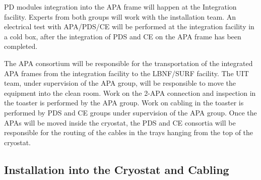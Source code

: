 
PD modules integration into the APA frame will happen at the Integration facility. Experts from both groups will work with the installation team. 
An electrical test with APA/PDS/CE will be performed at the integration facility in a cold box, after the integration of PDS and CE on the APA frame has been completed.

The APA consortium will be responsible for the transportation of the integrated APA frames from the integration facility to the LBNF/SURF facility. 
The UIT team, under supervision of the APA group, will be responsible to move the equipment into the clean room. 
Work on the 2-APA connection and inspection in the toaster is performed by the APA group.
Work on cabling in the toaster is performed by PDS and CE groups under supervision of the APA group.
Once the APAs will be moved inside the cryostat, the PDS and CE consortia will be responsible for the routing of the cables in the trays hanging from the top of the cryostat. 



\subsection{Installation into the Cryostat and Cabling}
\label{sec:fdsp-pd-install-pd-cryo}




